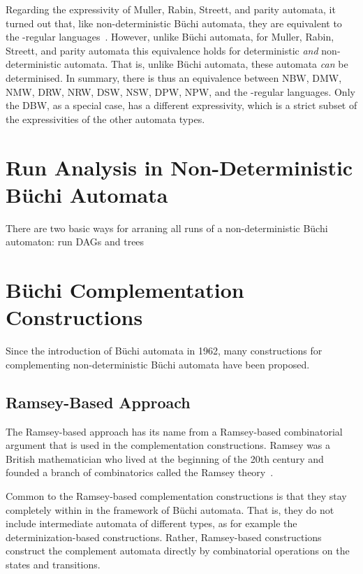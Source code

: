 Regarding the expressivity of Muller, Rabin, Streett, and parity automata, it turned out that, like non-deterministic Büchi automata, they are equivalent to the \om-regular languages~\cite{Thomas:1991}. However, unlike Büchi automata, for Muller, Rabin, Streett, and parity automata this equivalence holds for deterministic \textit{and} non-deterministic automata. That is, unlike Büchi automata, these automata \textit{can} be determinised. In summary, there is thus an equivalence between NBW, DMW, NMW, DRW, NRW, DSW, NSW, DPW, NPW, and the \om-regular languages. Only the DBW, as a special case, has a different expressivity, which is a strict subset of the expressivities of the other automata types. 



\section{Run Analysis in Non-Deterministic Büchi Automata}

There are two basic ways for arraning all runs of a non-deterministic Büchi automaton: run DAGs and trees~\cite{2014_wilke}


\section{Büchi Complementation Constructions}
Since the introduction of Büchi automata in 1962, many constructions for complementing non-deterministic Büchi automata have been proposed. 



\subsection{Ramsey-Based Approach}
The Ramsey-based approach has its name from a Ramsey-based combinatorial argument that is used in the complementation constructions. Ramsey was a British mathematician who lived at the beginning of the 20th century and founded a branch of combinatorics called the Ramsey theory~\cite{graham1990ramsey}.

Common to the  Ramsey-based complementation constructions is that they stay completely within in the framework of Büchi automata. That is, they do not include intermediate automata of different types, as for example the determinization-based constructions. Rather, Ramsey-based constructions construct the complement automata directly by combinatorial operations on the states and transitions.

